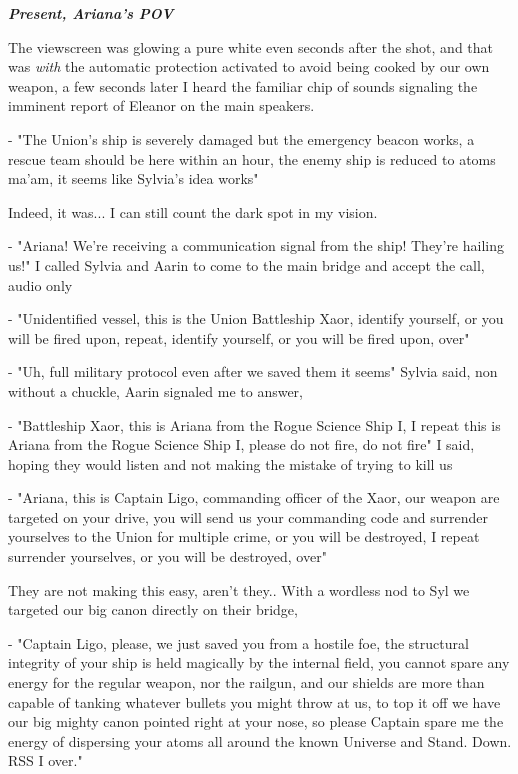 \documentclass[colorlinks,12pt,a4paper]{book}
\begin{document}
\textit{\textbf{Present, Ariana's POV}}\par
\bigskip
The viewscreen was glowing a pure white even seconds after the shot, and that was \textit{with} the automatic protection activated 
to avoid being cooked by our own weapon, a few seconds later I heard the familiar chip of sounds signaling the imminent report of Eleanor 
on the main speakers.\par 
\bigskip 

- "The Union's ship is severely damaged but the emergency beacon works, a rescue team should be here within an hour, the enemy ship 
is reduced to atoms ma'am, it seems like Sylvia's idea works"\par 
\bigskip 

Indeed, it was... I can still count the dark spot in my vision.\par
\bigskip

- "Ariana! We're receiving a communication signal from the ship! They're hailing us!"
I called Sylvia and Aarin to come to the main bridge and accept the call, audio only \par 
\bigskip

- "Unidentified vessel, this is the Union Battleship Xaor, identify yourself, or you will be fired upon, repeat, identify 
yourself, or you will be fired upon, over"\newline\par 
- "Uh, full military protocol even after we saved them it seems" Sylvia said, non without a chuckle, Aarin signaled me to answer,\newline\par
- "Battleship Xaor, this is Ariana from the Rogue Science Ship I, I repeat this is Ariana from the Rogue Science Ship I, please 
do not fire, do not fire" I said, hoping they would listen and not making the mistake of trying to kill us\par 
\bigskip 

- "Ariana, this is Captain Ligo, commanding officer of the Xaor, our weapon are targeted on your drive, you will send us your 
commanding code and surrender yourselves to the Union for multiple crime, or you will be destroyed, I repeat surrender yourselves, or 
you will be destroyed, over"\newline\par
They are not making this easy, aren't they.. With a wordless nod to Syl we targeted our big canon directly on their bridge,\newline \par
- "Captain Ligo, please, we just saved you from a hostile foe, the structural integrity of your ship is held magically by the internal 
field, you cannot spare any energy for the regular weapon, nor the railgun, and our shields are more than capable of tanking whatever 
bullets you might throw at us, to top it off we have our big mighty canon pointed right at your nose, so please Captain spare me the 
energy of dispersing your atoms all around the known Universe and Stand. Down. RSS I over."\par 
\bigskip 
\end{document}
